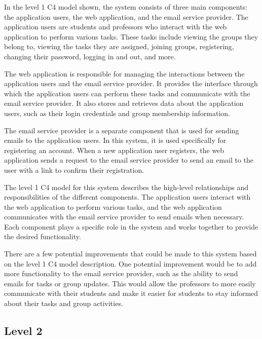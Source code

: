 \documentclass[singlespacing,12pt,parskip,headsepline,consistentlayout]{article}
\begin{document}
In the level 1 C4 model shown, the system consists of three main components: the application users, the web application, and the email service provider. The application users are students and professors who interact with the web application to perform various tasks. These tasks include viewing the groups they belong to, viewing the tasks they are assigned, joining groups, registering, changing their password, logging in and out, and more.

The web application is responsible for managing the interactions between the application users and the email service provider. It provides the interface through which the application users can perform these tasks and communicate with the email service provider. It also stores and retrieves data about the application users, such as their login credentials and group membership information.

The email service provider is a separate component that is used for sending emails to the application users. In this system, it is used specifically for registering an account. When a new application user registers, the web application sends a request to the email service provider to send an email to the user with a link to confirm their registration.

The level 1 C4 model for this system describes the high-level relationships and responsibilities of the different components. The application users interact with the web application to perform various tasks, and the web application communicates with the email service provider to send emails when necessary. Each component plays a specific role in the system and works together to provide the desired functionality.

There are a few potential improvements that could be made to this system based on the level 1 C4 model description. One potential improvement would be to add more functionality to the email service provider, such as the ability to send emails for tasks or group updates. This would allow the professors to more easily communicate with their students and make it easier for students to stay informed about their tasks and group activities.

\subsection{Level 2}
\end{document}
